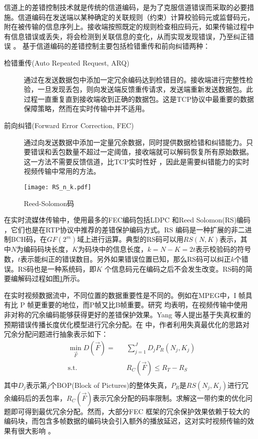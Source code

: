 信道上的差错控制技术就是传统的信道编码，是为了克服信道错误而采取的必要措施。信道编码在发送端以某种确定的关联规则（约束）计算校验码元或监督码元，附在被传输的信息序列上。接收端按照既定的规则检查相应码元，如果传输过程中有信息错误或丢失，将会检测到关联信息的变化，从而实现发现错误，乃至纠正错误 \cite{陈敏2004网络实时视频传输研究, wang1998error, wang2000error} 。
基于信道编码的差错控制主要包括检错重传和前向纠错两种：
\begin{description}
    \item[检错重传(Auto Repeated Request, ARQ) \cite{soltani2009delay, schier2012optimizing}] 通过在发送数据包中添加一定冗余编码达到检错目的。接收端进行完整性检验，一旦发现丢包，则向发送端反馈重传请求，发送端重新发送数据包。此过程一直重复直到接收端收到正确的数据包。这是TCP协议中最重要的数据保障策略，然而在实时传输中并不适用。
    \item[前向纠错(Forward Error Correction, FEC) \cite{nafaa2008forward}] 通过向发送数据中添加一定量冗余数据，同时提供数据检错和纠错能力。只要错误和丢包数量不超过一定阈值，接收端就可以解码恢复所有原始数据。这一方法不需要反馈信道，比TCP实时性好 \cite{davis1996joint}，因此是需要纠错能力的实时视频传输中常用的方法。
\end{description}

\begin{figure}[htbp]
  \centering
  \texttt{[image: RS\_n\_k.pdf]}
  \caption{Reed-Solomon码}
  \label{fig:RS_n_k}
\end{figure}

在实时流媒体传输中，使用最多的FEC编码包括LDPC \cite{richardson2003error}和Reed Solomon(RS)编码 \cite{wicker1999reed}，它们也是在RTP协议中推荐的差错保护编码方式。RS 编码是一种扩展的非二进制BCH码，在$GF(2^m)$域上进行运算。典型的RS码可以用$RS(N,K)$表示，其中$N$为编码码块长度，$K$为码块中的信息长度，$k=N-K=2t$表示校验码的符号数，$t$表示能纠正的错误数目。另外如果错误位置已知，那么RS码可以纠正$k$个错误。RS码也是一种系统码，即$K$ 个信息码元在编码之后不会发生改变。RS码的简要编解码过程如图\ref{fig:RS_n_k}所示。

在实时视频数据流中，不同位置的数据重要性是不同的。例如在MPEG中，I 帧具有比 P 帧更重要的地位，而P帧又比B帧重要。研究 \cite{yang2005unequal, zhang2011transmission, zhang2012novel, zhou2014novel} 均表明，在视频传输中使用非对称的冗余编码能够获得更好的差错保护效果。Yang \cite{yang2005unequal} 等人提出基于失真权重的预期错误传播长度优化模型进行冗余分配。在 \cite{zhang2011transmission} 中，作者利用失真最优化的思路对冗余分配问题进行抽象表示如下：
\begin{equation}
\begin{aligned}
& \underset{\vec F}{\min}D(\vec F) =
& &  \sum_{j=1}^J D_j P_R(N_j, K_j) \\
& \text{s.t.}
& & R_C(\vec F) \le R_T - R_S \\
\end{aligned}
\end{equation}
其中$D_j$表示第$j$个BOP(Block of Pictures)的整体失真，$P_R$是$RS(N_j, K_j)$进行冗余编码后的丢包率，$R_C(\vec F)$表示冗余分配的码率限制。求解这一带约束的优化问题即可得到最优冗余分配。然而，大部分FEC 框架的冗余保护效果依赖于较大的编码块，而包含多帧数据的编码块会引入额外的播放延迟，这对实时视频传输的效果有很大影响 \cite{wang2000error}。

